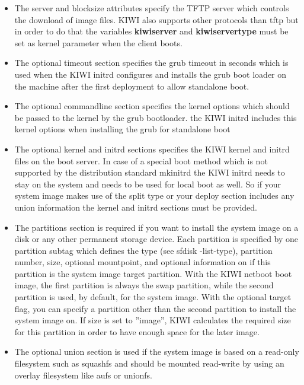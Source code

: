 \begin {itemize}
\item The server and blocksize attributes specify the TFTP server which
      controls the download of image files. KIWI also supports other protocols
      than tftp but in order to do that the variables \textbf{kiwiserver} and
      \textbf{kiwiservertype} must be set as kernel parameter when the client
      boots.
\item The optional timeout section specifies the grub timeout in seconds
      which is used when the KIWI initrd configures and installs the grub boot
      loader on the machine after the first deployment to allow standalone
      boot.
\item The optional commandline section specifies the kernel options which
      should be passed to the kernel by the grub bootloader. the KIWI
      initrd includes this kernel options when installing the grub for
      standalone boot
\item The optional kernel and initrd sections specifies the KIWI
      kernel and initrd files on the boot server. In case of a special boot
      method which is not supported by the distribution standard mkinitrd
      the KIWI initrd needs to stay on the system and needs to be used for
      local boot as well. So if your system image makes use of the split
      type or your deploy section includes any union information the
      kernel and initrd sections must be provided.
\item The partitions section is required if you want to install the system
      image on a disk or any other permanent storage device. Each partition is
      specified by one partition subtag which defines the type (see
      sfdisk -list-type), partition number, size, optional mountpoint, and
      optional information on if this partition is the system image
      target partition. With the KIWI netboot boot image, the first
      partition is always the swap partition, while the second partition
      is used, by default, for the system image. With the optional
      target flag, you can specify a partition other than the second
      partition to install the system image on. If size is set to ''image'',
      KIWI calculates the required size for this partition in order to
      have enough space for the later image.
\item The optional union section is used if the system image is based
      on a read-only filesystem such as squashfs and should be mounted
      read-write by using an overlay filesystem like aufs or unionfs.

\end{itemize}
